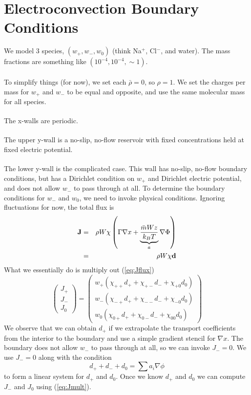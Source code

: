 \documentclass[final]{siamltex}
\begin{document}
\section{Electroconvection Boundary Conditions}

We model 3 species, $(w_+, w_-, w_0)$ (think Na$^+$, Cl$^-$, and water).
The mass fractions are something like $(10^{-4}, 10^{-4}, \sim 1)$.\\ \\

To simplify things (for now), we set each $\bar\rho=0$, so $\rho=1$.
We set the charges per mass for $w_+$ and $w_-$ to be equal and
opposite, and use the same molecular mass for all species.\\ \\

The x-walls are periodic.\\ \\

The upper y-wall is a no-slip, no-flow reservoir with fixed concentrations
held at fixed electric potential.\\ \\

The lower y-wall is the complicated case.  This wall 
has no-slip, no-flow boundary conditions, but has a Dirichlet condition
on $w_+$ and Dirichlet electric potential, and does not allow $w_-$ to
pass through at all.
To determine the boundary conditions for $w_-$ and $w_0$,
we need to invoke physical conditions.  Ignoring fluctuations for now,
the total flux is
\begin{eqnarray}
\bf{J} &=& \rho W \chi \left( \Gamma \nabla x + \underbrace{\frac{\bar{m} W z}{k_B T}}_{a}\nabla \Phi \right) \nonumber\\
&=& \rho W \chi {\bf d}\label{eq:Jflux}
\end{eqnarray}
What we essentially do is multiply out (\ref{eq:Jflux})
\begin{equation}
\left(\begin{array}{c}
J_+ \\
J_- \\
J_0
\end{array}\right)
=
\left(\begin{array}{ccc}
w_+(\chi_{++}d_+ + \chi_{+-}d_- + \chi_{+0}d_0) \\
w_-(\chi_{-+}d_+ + \chi_{--}d_- + \chi_{-0}d_0) \\
w_0(\chi_{0+}d_+ + \chi_{0-}d_- + \chi_{00}d_0)
\end{array}\right)\label{eq:Jmult}
\end{equation}
We observe that we can obtain $d_+$ if we extrapolate the transport coefficients from
the interior to the boundary and use a simple gradient stencil for $\nabla x$.
The boundary does not allow $w_-$ to pass through at all, so we can invoke $J_-=0$.
We use $J_-=0$ along with the condition
\begin{equation}
d_+ + d_- + d_0 = \sum a_i \nabla\phi
\end{equation}
to form a linear system for $d_+$ and $d_0$.
Once we know $d_+$ and $d_0$ we can compute $J_-$ and $J_0$ using (\ref{eq:Jmult}).



\end{document}

